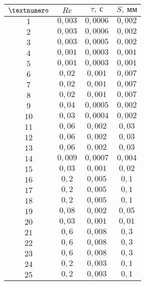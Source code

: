 \begin{tabular}{|c|c|c|c|}
  \hline
  $\textnumero$ & $Re$ & $\tau,\ с$ & $S,\ мм$\\ \hline %
  $1$ & $0,003$ & $0,0006$ & $0,002$\\ \hline
  $2$ & $0,003$ & $0,0006$ & $0,002$\\ \hline
  $3$ & $0,003$ & $0,0005$ & $0,002$\\ \hline
  $4$ & $0,001$ & $0,0003$ & $0,001$\\ \hline
  $5$ & $0,001$ & $0,0003$ & $0,001$\\ \hline

  $6$ & $0,02$ & $0,001$ & $0,007$\\ \hline
  $7$ & $0,02$ & $0,001$ & $0,007$\\ \hline
  $8$ & $0,02$ & $0,001$ & $0,007$\\ \hline
  $9$ & $0,04$ & $0,0005$ & $0,002$\\ \hline
  $10$ & $0,03$ & $0,0004$ & $0,002$\\ \hline

  $11$ & $0,06$ & $0,002$ & $0,03$\\ \hline
  $12$ & $0,06$ & $0,002$ & $0,03$\\ \hline
  $13$ & $0,06$ & $0,002$ & $0,03$\\ \hline
  $14$ & $0,009$ & $0,0007$ & $0,004$\\ \hline
  $15$ & $0,03$ & $0,001$ & $0,02$\\ \hline

  $16$ & $0,2$ & $0,005$ & $0,1$\\ \hline
  $17$ & $0,2$ & $0,005$ & $0,1$\\ \hline
  $18$ & $0,2$ & $0,005$ & $0,1$\\ \hline
  $19$ & $0,08$ & $0,002$ & $0,05$\\ \hline
  $20$ & $0,03$ & $0,001$ & $0,01$\\ \hline

  $21$ & $0,6$ & $0,008$ & $0,3$\\ \hline
  $22$ & $0,6$ & $0,008$ & $0,3$\\ \hline
  $23$ & $0,6$ & $0,008$ & $0,3$\\ \hline
  $24$ & $0,2$ & $0,003$ & $0,1$\\ \hline
  $25$ & $0,2$ & $0,003$ & $0,1$\\ \hline
\end{tabular}